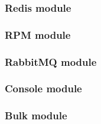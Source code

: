 \subsubsection{Redis module} %
\label{ssub:redis_module}
\subsubsection{RPM module} %
\label{ssub:rpm_module}
\subsubsection{RabbitMQ module} %
\label{ssub:rabbitmq_module}
\subsubsection{Console module} %
\label{ssub:console_module}
\subsubsection{Bulk module} %
\label{ssub:bulk_module}








